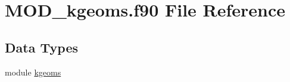 \hypertarget{MOD__kgeoms_8f90}{\section{M\-O\-D\-\_\-kgeoms.\-f90 File Reference}
\label{MOD__kgeoms_8f90}
}
\subsection*{Data Types}
\begin{DoxyCompactItemize}
\item 
module \hyperlink{classkgeoms}{kgeoms}
\end{DoxyCompactItemize}
